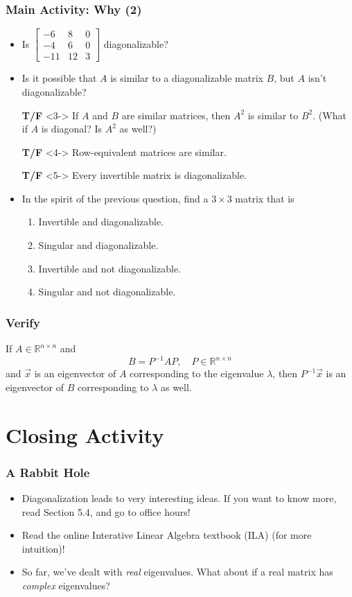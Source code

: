 \documentclass{beamer}
\begin{document}
		\begin{frame}
			\frametitle{Main Activity: Why (2)}
			\begin{itemize}
				\item<1-> Is \(\begin{bmatrix}-6 & 8 & 0 \\ -4 & 6 & 0 \\ -11 & 12 & 3\end{bmatrix}\) diagonalizable?
				\item<2-> Is it possible that \(A\) is similar to a diagonalizable matrix \(B\), but \(A\) isn't diagonalizable?
				\item[\textbf{T/F}]<3-> If \(A\) and \(B\) are similar matrices, then \(A^2\) is similar to \(B^2\). (What if \(A\) is diagonal? Is \(A^2\) as well?)
				\item[\textbf{T/F}]<4-> Row-equivalent matrices are similar.
				\item[\textbf{T/F}]<5-> Every invertible matrix is diagonalizable.
				\item<6-> In the spirit of the previous question, find a \(3 \times 3\) matrix that is
						\begin{enumerate}
							\item<7-> Invertible and diagonalizable.
							\item<8-> Singular and diagonalizable.
							\item<9-> Invertible and not diagonalizable.
							\item<10-> Singular and not diagonalizable.
						\end{enumerate} 
			\end{itemize}
		\end{frame}

	\begin{frame}
		\frametitle{Verify}
		If \(A \in \mathbb{R}^{n \times n}\) and \[B = P^{-1}AP, \quad P \in \mathbb{R}^{n \times n}\] and \(\vec{x}\) is an eigenvector of \(A\)
		corresponding to the eigenvalue \(\lambda\), then \(P^{-1}\vec{x}\) is an eigenvector of \(B\) corresponding to \(\lambda\) as well.
	\end{frame}
	
	\section{Closing Activity}
		\begin{frame}
			\frametitle{A Rabbit Hole}
			\begin{itemize}
				\item<1-> Diagonalization leads to very interesting ideas. If you want to know more, read Section 5.4, and go to office hours!
				\item<2-> Read the online Interative Linear Algebra textbook (ILA) (for more intuition)!
				\item<3-> So far, we've dealt with \emph{real} eigenvalues. What about if a real matrix has \emph{complex} eigenvalues?
			\end{itemize} \pause
		\end{frame}
\end{document}
